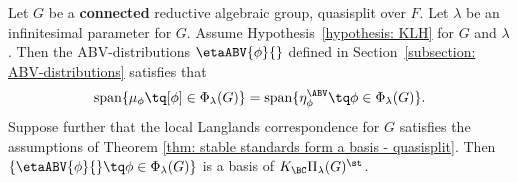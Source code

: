 \documentclass[11pt,letterpaper]{amsart}
\numberwithin{equation}{section}
\begin{document}
\begin{theorem}\label{theorem: Conjecture 2 qs}
Let $G$ be a {\bf connected} reductive algebraic group, quasisplit over $F$. 
Let $\lambda$ be an infinitesimal parameter for $G$.
Assume Hypothesis~\ref{hypothesis: KLH} for $G$ and $\lambda$.
Then the ABV-distributions $\etaABV{\phi}{}$ defined in Section~\ref{subsection: ABV-distributions} satisfies that
\[
\operatorname{span}
\{\mu_{\phi} \tq [\phi] \in \Phi_\lambda(G) \}
= 
\operatorname{span}
\{\eta_{\phi}^{\ABV} \tq \phi \in \Phi_\lambda(G) \}.
\]
Suppose further that the local Langlands correspondence for $G$ satisfies the assumptions of Theorem \ref{thm: stable standards form a basis - quasisplit}. Then $\{\etaABV{\phi}{} \tq \phi \in \Phi_\lambda(G) \}$ is a basis of $K_{\BC}\Pi_{\lambda}(G)^{\st}$.

\end{theorem}
\end{document}
